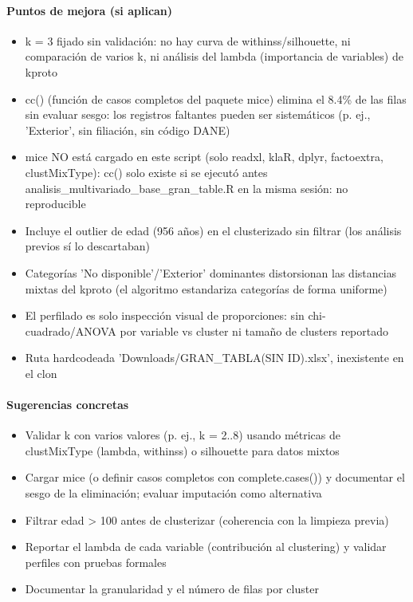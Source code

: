 \paragraph{Puntos de mejora (si aplican)}
\begin{itemize}
  \item k = 3 fijado sin validación: no hay curva de withinss/silhouette, ni comparación de varios k, ni análisis del lambda (importancia de variables) de kproto
  \item cc() (función de casos completos del paquete mice) elimina el 8.4\% de las filas sin evaluar sesgo: los registros faltantes pueden ser sistemáticos (p. ej., 'Exterior', sin filiación, sin código DANE)
  \item mice NO está cargado en este script (solo readxl, klaR, dplyr, factoextra, clustMixType): cc() solo existe si se ejecutó antes analisis\_multivariado\_base\_gran\_table.R en la misma sesión: no reproducible
  \item Incluye el outlier de edad (956 años) en el clusterizado sin filtrar (los análisis previos sí lo descartaban)
  \item Categorías 'No disponible'/'Exterior' dominantes distorsionan las distancias mixtas del kproto (el algoritmo estandariza categorías de forma uniforme)
  \item El perfilado es solo inspección visual de proporciones: sin chi-cuadrado/ANOVA por variable vs cluster ni tamaño de clusters reportado
  \item Ruta hardcodeada 'Downloads/GRAN\_TABLA(SIN ID).xlsx', inexistente en el clon
\end{itemize}

\paragraph{Sugerencias concretas}
\begin{itemize}
  \item Validar k con varios valores (p. ej., k = 2..8) usando métricas de clustMixType (lambda, withinss) o silhouette para datos mixtos
  \item Cargar mice (o definir casos completos con complete.cases()) y documentar el sesgo de la eliminación; evaluar imputación como alternativa
  \item Filtrar edad > 100 antes de clusterizar (coherencia con la limpieza previa)
  \item Reportar el lambda de cada variable (contribución al clustering) y validar perfiles con pruebas formales
  \item Documentar la granularidad y el número de filas por cluster
\end{itemize}

